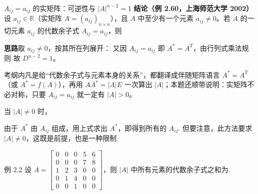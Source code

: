 \begin{fdeep}{$A_{ij}=a_{ij}$ 的实矩阵：可逆性与 $|A|^{n-2}=1$}
\textbf{结论（例 2.60，上海师范大学 2002）}\quad 设 $a_{ij}\in\mathbb{R}$（实矩阵 $A=(a_{ij})_{n\times n}$），且 $A$ 中至少有一个元素 $a_{ij}\neq0$。若 $A$ 的一切元素 $a_{ij}$ 的代数余子式 $A_{ij}=a_{ij}$，则

\textbf{思路}\quad 取 $a_{ij}\neq0$，按其所在列展开：
又因 $A_{ij}=a_{ij}$ 即 $A^{*}=A^{T}$，由行列式乘法规则
故 $D^{n-2}=1$。

\textbf{\fbref{}}考纲内凡是给“代数余子式与元素本身的关系”，都翻译成伴随矩阵语言 $A^{*}=A^{T}$（或 $A^{*}=f(A)$），再用 $AA^{*}=|A|E$ 一次算出 $|A|$；本题还顺带说明：实矩阵不必对称，只要 $A_{ij}=a_{ij}$ 就一定有 $|A|>0$。
\end{fdeep}


当 $|A|\ne0$ 时，

由于 $A^{*}$ 由 $A_{ij}$ 组成，用上式求出 $A^{*}$，即得到所有的 $A_{ij}$. 但要注意，此方法要求 $|A|\ne0$，这既是前提，也是一种限制.

\begin{fcard}{例 2.2}
设 $A=\begin{bmatrix}0&0&0&5&6\\0&0&0&7&8\\1&2&3&0&0\\0&1&4&0&0\\0&0&1&0&0\end{bmatrix}$，则 $|A|$ 中所有元素的代数余子式之和为\underline{\hspace{2.6em}}.
\end{fcard}

